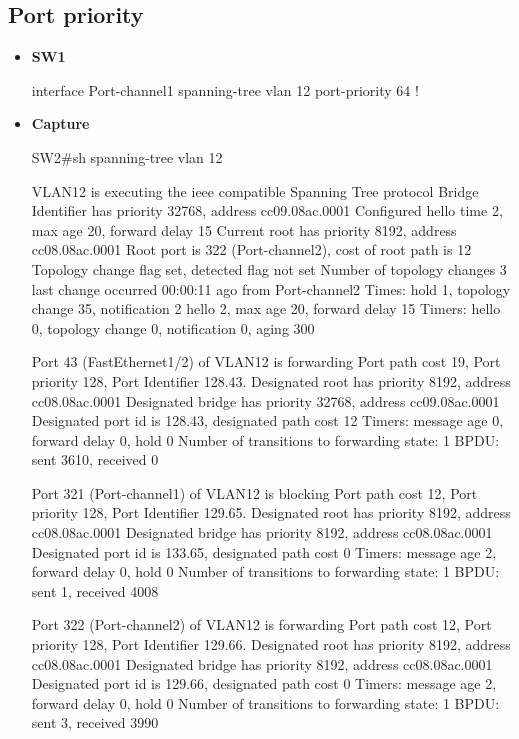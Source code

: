 \documentclass[10pt]{article}
\begin{document}
\subsection{Port priority}
\begin{itemize}
\item {\bf SW1}
\begin{verbatim*}
interface Port-channel1
 spanning-tree vlan 12 port-priority 64
!
\end{verbatim*}
\item {\bf Capture}
\begin{verbatim*}
SW2#sh spanning-tree vlan 12

VLAN12 is executing the ieee compatible Spanning Tree protocol
Bridge Identifier has priority 32768, address cc09.08ac.0001
Configured hello time 2, max age 20, forward delay 15
Current root has priority 8192, address cc08.08ac.0001
Root port is 322 (Port-channel2), cost of root path is 12
Topology change flag set, detected flag not set
Number of topology changes 3 last change occurred 00:00:11 ago
from Port-channel2
Times:  hold 1, topology change 35, notification 2
hello 2, max age 20, forward delay 15
Timers: hello 0, topology change 0, notification 0, aging 300

Port 43 (FastEthernet1/2) of VLAN12 is forwarding
Port path cost 19, Port priority 128, Port Identifier 128.43.
Designated root has priority 8192, address cc08.08ac.0001
Designated bridge has priority 32768, address cc09.08ac.0001
Designated port id is 128.43, designated path cost 12
Timers: message age 0, forward delay 0, hold 0
Number of transitions to forwarding state: 1
BPDU: sent 3610, received 0

Port 321 (Port-channel1) of VLAN12 is blocking
Port path cost 12, Port priority 128, Port Identifier 129.65.
Designated root has priority 8192, address cc08.08ac.0001
Designated bridge has priority 8192, address cc08.08ac.0001
Designated port id is 133.65, designated path cost 0
Timers: message age 2, forward delay 0, hold 0
Number of transitions to forwarding state: 1
BPDU: sent 1, received 4008

Port 322 (Port-channel2) of VLAN12 is forwarding
Port path cost 12, Port priority 128, Port Identifier 129.66.
Designated root has priority 8192, address cc08.08ac.0001
Designated bridge has priority 8192, address cc08.08ac.0001
Designated port id is 129.66, designated path cost 0
Timers: message age 2, forward delay 0, hold 0
Number of transitions to forwarding state: 1
BPDU: sent 3, received 3990
\end{verbatim*}
\end{itemize}
\end{document}
